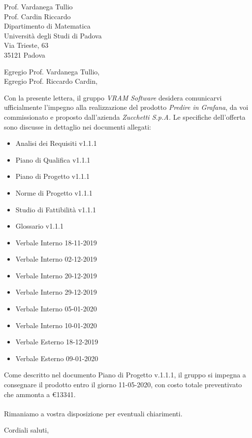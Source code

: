\documentclass[a4paper,12pt]{letteracdp}
\date{14 gennaio 2020}
\begin{document}
\begin{letter}{
		Prof. Vardanega Tullio \\
		Prof. Cardin Riccardo \\
		Dipartimento di Matematica \\
		Università degli Studi di Padova \\
		Via Trieste, 63 \\
		35121 Padova}
	
	\opening{Egregio Prof. Vardanega Tullio, \\ Egregio Prof. Riccardo Cardin,}
	
	Con la presente lettera, il gruppo \textit{VRAM Software} desidera comunicarvi ufficialmente l'impegno alla realizzazione del prodotto \textit{Predire in Grafana}, da voi commissionato e proposto dall'azienda \textit{Zucchetti S.p.A.}
	Le specifiche dell'offerta sono discusse in dettaglio nei documenti allegati:
	
	\begin{itemize}
		\item Analisi dei Requisiti v1.1.1
		\item Piano di Qualifica v1.1.1
		\item Piano di Progetto v1.1.1
		\item Norme di Progetto v1.1.1
		\item Studio di Fattibilità v1.1.1
		\item Glossario v1.1.1
		\item Verbale Interno 18-11-2019
		\item Verbale Interno 02-12-2019
		\item Verbale Interno 20-12-2019
		\item Verbale Interno 29-12-2019
		\item Verbale Interno 05-01-2020
		\item Verbale Interno 10-01-2020
		\item Verbale Esterno 18-12-2019
		\item Verbale Esterno 09-01-2020
	\end{itemize}

	\noindent Come descritto nel documento Piano di Progetto v.1.1.1, il gruppo si impegna a consegnare il prodotto entro il giorno 11-05-2020, con costo totale preventivato che ammonta a \euro{13341}.
	\\
	\\
	Rimaniamo a vostra disposizione per eventuali chiarimenti.
	
	\closing{Cordiali saluti,}
	
\end{letter}	
\end{document}
